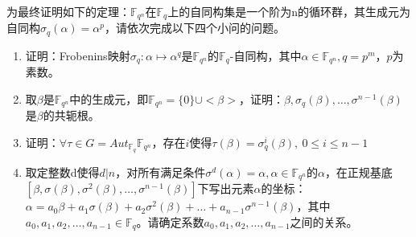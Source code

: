 为最终证明如下的定理：$\mathbb{F}_{q^n}$在$\mathbb{F}_{q}$上的自同构集是一个阶为n的循环群，其生成元为自同构$\sigma_q(\alpha)=\alpha^p$，请依次完成以下四个小问的问题。
\begin{enumerate}
    \item 证明：Frobenins映射$\sigma_q:\alpha\mapsto\alpha^q$是$\mathbb{F}_{q^n}$的$\mathbb{F}_{q}$-自同构，其中$\alpha\in\mathbb{F}_{q^n}, q=p^m$，$p$为素数。


    \item 取$\beta$是$\mathbb{F}_{q^n}$中的生成元，即$\mathbb{F}_{q^n}=\{0\}\cup<\beta>$，证明：$\beta,\sigma_q(\beta),\dots,\sigma^{n-1}(\beta)$是$\beta$的共轭根。

    \item 证明：$\forall\tau\in G=Aut_{\mathbb{F}_{q}}{\mathbb{F}_{q^n}}$，存在$i$使得$\tau(\beta)=\sigma_q^i(\beta),\ 0\leq i\leq n-1$

    \item 取定整数d使得$d|n$，对所有满足条件$\sigma^d(\alpha)=\alpha, \alpha\in\mathbb{F}_{q^n}$的$\alpha$，在正规基底$[\beta,\sigma(\beta),\sigma^2(\beta),\dots,\sigma^{n-1}(\beta)]$下写出元素$\alpha$的坐标：$\alpha=a_0\beta+a_1\sigma(\beta)+a_2\sigma^2(\beta)+\dots+a_{n-1}\sigma^{n-1}(\beta)$，其中$a_0,a_1,a_2,\dots,a_{n-1}\in\mathbb{F}_{q}$。请确定系数$a_0,a_1,a_2,\dots,a_{n-1}$之间的关系。
\end{enumerate}